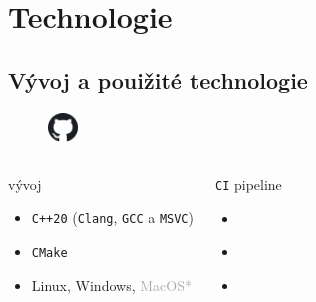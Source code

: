 \documentclass[compress]{beamer}
\begin{document}
\section{Technologie}

\subsection{Vývoj a pouižité technologie}

\begin{frame}
	\vspace{-0.5cm}
	\begin{figure}
		\centering
		\includegraphics[width=0.07\textwidth]{img/logos/github.pdf}
	\end{figure}
	\centering
	\vspace{-0.4cm}
	\href{https://github.com/silhavyj/ZeroMate}{}
	\vspace{-0.1cm}
	\noindent\makebox[\linewidth]{\rule{\textwidth}{0.4pt}}
	\begin{columns}
		\begin{block}{vývoj}
			\begin{itemize}
				\item \texttt{C++20} (\texttt{Clang}, \texttt{GCC} a \texttt{MSVC})
				\item \texttt{CMake}
				\item Linux, Windows, \textcolor{darkgray}{MacOS*}
			\end{itemize}
		\end{block}
		\begin{block}{\texttt{CI} pipeline}
			\begin{itemize}
				\item \href{https://app.codecov.io/gh/silhavyj/ZeroMate}{}
				\item \href{https://app.codacy.com/gh/silhavyj/ZeroMate/dashboard}{}
				\item \href{https://silhavyj.github.io/ZeroMate}{}
			\end{itemize}
		\end{block}
	\end{columns}
	\vspace{0.2cm}
	\noindent\makebox[\linewidth]{\rule{\textwidth}{0.4pt}}

\end{frame}
\end{document}

